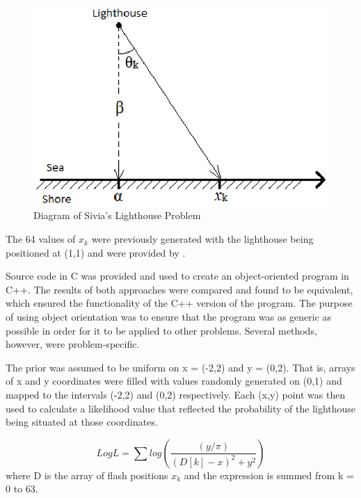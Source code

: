 \documentclass[a4paper,12pt]{article}
\begin{document}
\begin{figure}[!h]
 \begin{center}
  \includegraphics[scale=0.75]{lighthouse.eps}
  \caption{Diagram of Sivia's Lighthouse Problem \cite{sivia}}
 \end{center}
\end{figure}

The 64 values of $x_{k}$ were previously generated with the lighthouse being positioned at (1,1) and were provided by \cite{sivia}.

Source code in C was provided and used to create an object-oriented program in C++.  The results of both approaches were compared and found to be equivalent, which ensured the functionality of the C++ version of the program.  The purpose of using object orientation was to ensure that the program was as generic as possible in order for it to be applied to other problems.  Several methods, however, were problem-specific.
\newline
     
The prior was assumed to be uniform on x = (-2,2) and y = (0,2).  That is, arrays of x and y coordinates were filled with values randomly generated on (0,1) and mapped to the intervals (-2,2) and (0,2) respectively.  Each (x,y) point was then used to calculate a likelihood value that reflected the probability of the lighthouse being situated at those coordinates.
\newline

\begin{equation}
 LogL = \sum log(\frac{(y/\pi)}{(D[k]-x)^{2} + y^{2}})
\end{equation}
where D is the array of flash positions $x_{k}$ and the expression is summed from k = 0 to 63.
\end{document}
